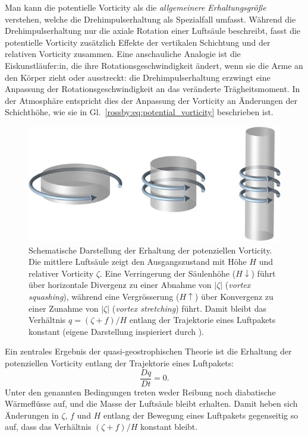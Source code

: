 Man kann die potentielle Vorticity als die \emph{allgemeinere Erhaltungsgröße}
verstehen, welche die Drehimpulserhaltung als Spezialfall umfasst. Während
%
die Drehimpulserhaltung nur die axiale Rotation einer Luftsäule beschreibt,
fasst die potentielle Vorticity zusätzlich Effekte der vertikalen Schichtung
und der relativen Vorticity zusammen. Eine anschauliche Analogie ist die
Eiskunstläufer:in, die ihre Rotationsgeschwindigkeit ändert, wenn sie die Arme
%
an den Körper zieht oder ausstreckt: die Drehimpulserhaltung erzwingt eine
Anpassung der Rotationsgeschwindigkeit an das veränderte Trägheitsmoment. In der
Atmosphäre entspricht dies der Anpassung der Vorticity an Änderungen der
Schichthöhe, wie sie in Gl.~\eqref{rossby:eq:potential_vorticity} beschrieben ist.



\begin{figure}
	\centering
	\includegraphics[width=\textwidth]{papers/rossby/images/column_streching.jpeg}


	\caption{%
		Schematische Darstellung der Erhaltung der potenziellen Vorticity.
		Die mittlere Luftsäule zeigt den Ausgangszustand mit Höhe $H$ und relativer
		Vorticity $\zeta$. Eine Verringerung der Säulenhöhe ($H \downarrow$) führt
		über horizontale Divergenz zu einer Abnahme von $|\zeta|$
		(\emph{vortex squashing}), während eine Vergrösserung ($H \uparrow$) über
		Konvergenz zu einer Zunahme von $|\zeta|$ (\emph{vortex stretching}) führt.
		Damit bleibt das Verhältnis $q=(\zeta+f)/H$ entlang der Trajektorie eines
		Luftpakets konstant (eigene Darstellung inspieriert durch \cite{rossby:beal_pv}).%
	}
	\label{fig:pv_conservation}
\end{figure}


Ein zentrales Ergebnis der quasi-geostrophischen Theorie ist die Erhaltung der
%
%
potenziellen Vorticity entlang der Trajektorie eines Luftpakets:
%
\begin{equation}
	\frac{Dq}{Dt} = 0.
	\label{rossby:eq:pv_conservation}
\end{equation}
Unter den genannten Bedingungen treten weder Reibung noch diabatische Wärmeflüsse auf, und die Masse der Luftsäule bleibt erhalten.
%
Damit heben sich Änderungen in \(\zeta\), \(f\) und \(H\) entlang der Bewegung eines Luftpakets gegenseitig so auf, dass das Verhältnis \((\zeta + f)/H\) konstant bleibt.

